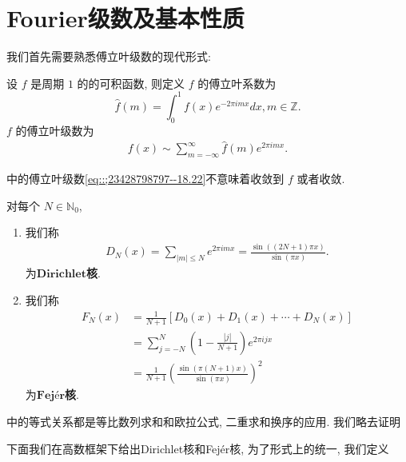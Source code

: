 \documentclass[../../main.tex]{subfiles}
\begin{document}
\section{Fourier级数及基本性质}

我们首先需要熟悉傅立叶级数的现代形式:

\begin{definition}\label{definition:定义18.2}
设 $f$ 是周期 $1$ 的的可积函数, 则定义 $f$ 的傅立叶系数为
\[
\hat{f}(m) = \int_{0}^{1} f(x) e^{-2\pi i m x} dx, m \in \mathbb{Z}.
\]
$f$ 的傅立叶级数为
\begin{align*}
f(x) \sim \sum_{m = -\infty}^{\infty} \hat{f}(m) e^{2\pi i m x}.
\end{align*}
\end{definition}
\begin{remark}
中的傅立叶级数\eqref{eq::;23428798797--18.22}不意味着收敛到 $f$ 或者收敛.
\end{remark}

\begin{definition}\label{definition:定义18.3}
对每个 $N \in \mathbb{N}_0$,
\begin{enumerate}
\item 我们称
\begin{align*}
D_N(x) = \sum_{|m| \leqslant N} e^{2\pi i m x} = \frac{\sin((2N + 1)\pi x)}{\sin(\pi x)}. 
\end{align*}
为$\mathbf{Dirichlet}$\textbf{核}.

\item 我们称
\begin{align*}
F_N(x) &= \frac{1}{N + 1}[D_0(x) + D_1(x) + \cdots + D_N(x)] \\
&= \sum_{j = -N}^{N} \left(1 - \frac{|j|}{N + 1}\right) e^{2\pi i j x} \\
&= \frac{1}{N + 1} \left( \frac{\sin(\pi (N + 1) x)}{\sin(\pi x)} \right)^2
\end{align*}
为$\mathbf{Fejér}$\textbf{核}.
\end{enumerate}
\end{definition}
\begin{remark}
中的等式关系都是等比数列求和和欧拉公式, 二重求和换序的应用. 我们略去证明
\end{remark}

下面我们在高数框架下给出Dirichlet核和Fejér核, 为了形式上的统一, 我们定义
\end{document}
